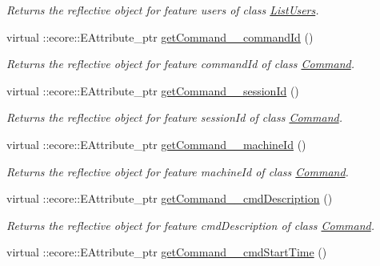 \begin{DoxyCompactItemize}
\begin{DoxyCompactList}\small\item\em Returns the reflective object for feature users of class \hyperlink{classUMS__Data_1_1ListUsers}{ListUsers}. \item\end{DoxyCompactList}\item 
virtual ::ecore::EAttribute\_\-ptr \hyperlink{classUMS__Data_1_1UMS__DataPackage_a6dca6810dfc4d1c23d459fd1320c866e}{getCommand\_\-\_\-commandId} ()
\begin{DoxyCompactList}\small\item\em Returns the reflective object for feature commandId of class \hyperlink{classUMS__Data_1_1Command}{Command}. \item\end{DoxyCompactList}\item 
virtual ::ecore::EAttribute\_\-ptr \hyperlink{classUMS__Data_1_1UMS__DataPackage_a4197b9cbcecd25138f738fbd711857b6}{getCommand\_\-\_\-sessionId} ()
\begin{DoxyCompactList}\small\item\em Returns the reflective object for feature sessionId of class \hyperlink{classUMS__Data_1_1Command}{Command}. \item\end{DoxyCompactList}\item 
virtual ::ecore::EAttribute\_\-ptr \hyperlink{classUMS__Data_1_1UMS__DataPackage_a58976020268d998c391703874a6cc653}{getCommand\_\-\_\-machineId} ()
\begin{DoxyCompactList}\small\item\em Returns the reflective object for feature machineId of class \hyperlink{classUMS__Data_1_1Command}{Command}. \item\end{DoxyCompactList}\item 
virtual ::ecore::EAttribute\_\-ptr \hyperlink{classUMS__Data_1_1UMS__DataPackage_ab8ea145368851760d7e3942897f95091}{getCommand\_\-\_\-cmdDescription} ()
\begin{DoxyCompactList}\small\item\em Returns the reflective object for feature cmdDescription of class \hyperlink{classUMS__Data_1_1Command}{Command}. \item\end{DoxyCompactList}\item 
virtual ::ecore::EAttribute\_\-ptr \hyperlink{classUMS__Data_1_1UMS__DataPackage_ada6def3f11cdd1365f87f1c38d42dbd2}{getCommand\_\-\_\-cmdStartTime} ()

\end{DoxyCompactItemize}
